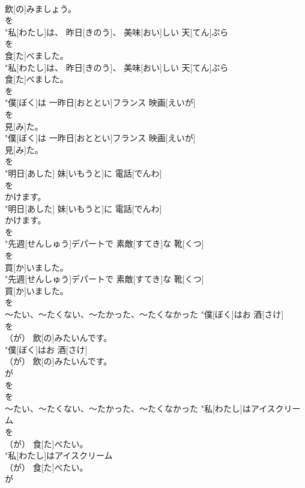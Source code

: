 \documentclass[8pt]{extreport}
\begin{document}
\begin{CJK}{UTF8}{min}
\\	飲[の]みましょう。
\\	を
\\	"私[わたし]は、 昨日[きのう]、 美味[おい]しい 天[てん]ぷら
\\	を
\\	食[た]べました。
\\	"私[わたし]は、 昨日[きのう]、 美味[おい]しい 天[てん]ぷら
\\	食[た]べました。
\\	を
\\	"僕[ぼく]は 一昨日[おととい]フランス 映画[えいが]
\\	を
\\	見[み]た。
\\	"僕[ぼく]は 一昨日[おととい]フランス 映画[えいが]
\\	見[み]た。
\\	を
\\	"明日[あした] 妹[いもうと]に 電話[でんわ]
\\	を
\\	かけます。
\\	"明日[あした] 妹[いもうと]に 電話[でんわ]
\\	かけます。
\\	を
\\	"先週[せんしゅう]デパートで 素敵[すてき]な 靴[くつ]
\\	を
\\	買[か]いました。
\\	"先週[せんしゅう]デパートで 素敵[すてき]な 靴[くつ]
\\	買[か]いました。
\\	を
\\	～たい、～たくない、～たかった、～たくなかった	"僕[ぼく]はお 酒[さけ]
\\	を
\\	（が） 飲[の]みたいんです。
\\	"僕[ぼく]はお 酒[さけ]
\\	（が） 飲[の]みたいんです。
\\	が 
\\	を 
\\	を
\\	～たい、～たくない、～たかった、～たくなかった	"私[わたし]はアイスクリーム
\\	を
\\	（が） 食[た]べたい。
\\	"私[わたし]はアイスクリーム
\\	（が） 食[た]べたい。
\\	が 

\end{CJK}
\end{document}
